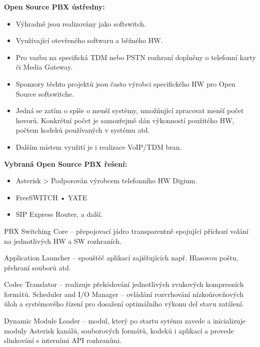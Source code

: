 
\textbf{Open Source PBX ústředny:}
\begin{itemize}[noitemsep]
    \item Výhradně jsou realizovány jako softswitch.
    \item Využívající otevřeného softwaru a běžného HW.
    \item Pro vazbu na specifická TDM nebo PSTN rozhraní doplněny o telefonní karty či Media Gateway.
    \item Sponzory těchto projektů jsou často výrobci specifického HW pro Open Source softswitche.
    \item Jedná se zatím o spíše o menší systémy, umožňující zpracovat menší počet hovorů. Konkrétní počet je samozřejmě dán výkonností použitého HW, počtem kodeků používaných v systému atd.
    \item Dalším místem využití je i realizace VoIP/TDM bran.
\end{itemize}

\noindent\textbf{Vybraná Open Source PBX řešení:}
\begin{itemize}[noitemsep]
    \item Asterisk > Podporován výrobcem telefonního HW Digium.
    \item FreeSWITCH • YATE
    \item SIP Express Router, a další.
\end{itemize}


PBX Switching Core -- přepojovací jádro transparentně spojující příchozí volání na jednotlivých HW a SW rozhraních.

Application Launcher -- spouštěč aplikací zajišťujících např. Hlasovou poštu, přehraní souborů atd.

Codec Translator -- realizuje překódování jednotlivých zvukových kompresních formátů.
Scheduler and I/O Manager -- ovládání rozvrhování nízkoúrovňových úloh a systémového řízení pro dosažení optimálního výkonu del stavu zatížení.

Dynamic Module Loader -- modul, který po startu sytému zavede a inicializuje moduly Asterisk kanálů, souborových formátů, kodeků i aplikací a provede slinkování s interními API rozhraními.

